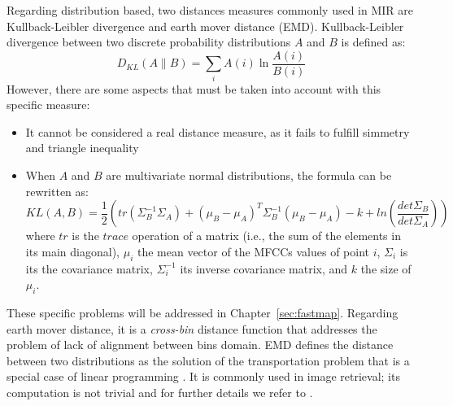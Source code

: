 Regarding distribution based, two distances measures commonly used in MIR are Kullback-Leibler divergence and earth mover distance (EMD). 
Kullback-Leibler divergence between two discrete probability distributions $A$ and $B$ is defined as:
\begin{equation}
D_{KL}(A \lVert B) = \sum\limits_{i}^{} A(i) \ln \frac{A(i)}{B(i)}
\end{equation} 
However, there are some aspects that must be taken into account with this specific measure:
\begin{itemize}
\item It cannot be considered a real distance measure, as it fails to fulfill simmetry and triangle inequality
\item When $A$ and $B$ are multivariate normal distributions, the formula can be rewritten as:
\begin{equation}
KL(A, B) = \frac{1}{2}\left(tr(\Sigma_{B}^{-1}\Sigma_{A}) + (\mu_{B} - \mu_{A})^T \Sigma_{B}^{-1}(\mu_{B} - \mu_{A}) - k + ln\left(\frac{det\Sigma_{B}}{det\Sigma_{A}}\right)\right)
\label{eq:kl_norm}
\end{equation}
where $tr$ is the $trace$ operation of a matrix (i.e., the sum of the elements in its main diagonal), $\mu_i$ the mean vector of the MFCCs values of point $i$, $\Sigma_i$ is its the covariance matrix, $\Sigma_i^{-1}$ its inverse covariance matrix, and $k$ the size of $\mu_i$. 
\end{itemize}

These specific problems will be addressed in Chapter~\ref{sec:fastmap}. Regarding earth mover distance, it is a \textit{cross-bin} distance function that addresses the problem of lack of alignment between bins domain.  EMD defines the distance between two distributions as the solution of the transportation problem that is a special case of linear programming \cite{ling07}. It is commonly used in image retrieval; its computation is not trivial and for further details we refer to \cite{emd}. 

